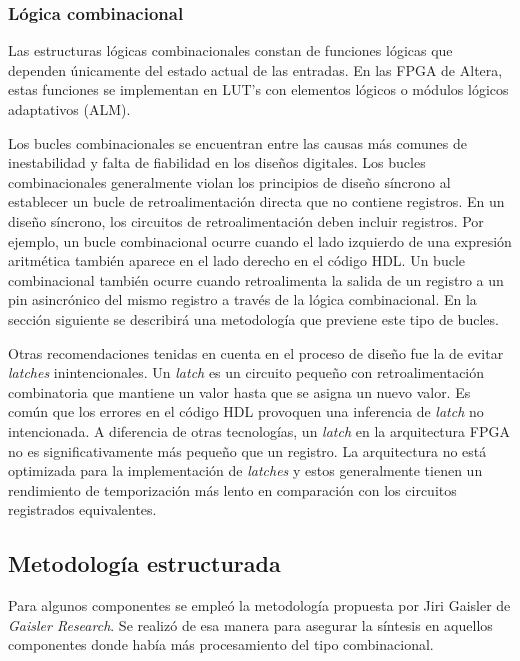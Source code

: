 \subsubsection{Lógica combinacional}

Las estructuras lógicas combinacionales constan de funciones lógicas que dependen únicamente del estado actual de las entradas. En las FPGA de Altera, estas funciones se implementan en LUT's con elementos lógicos o módulos lógicos adaptativos (ALM).

Los bucles combinacionales se encuentran entre las causas más comunes de inestabilidad y falta de fiabilidad en los diseños digitales. Los bucles combinacionales generalmente violan los principios de diseño síncrono al establecer un bucle de retroalimentación directa que no contiene registros. En un diseño síncrono, los circuitos de retroalimentación deben incluir registros. Por ejemplo, un bucle combinacional ocurre cuando el lado izquierdo de una expresión aritmética también aparece en el lado derecho en el código HDL. Un bucle combinacional también ocurre cuando retroalimenta la salida de un registro a un pin asincrónico del mismo registro a través de la lógica combinacional. En la sección siguiente se describirá una metodología que previene este tipo de bucles.

Otras recomendaciones tenidas en cuenta en el proceso de diseño fue la de evitar \textit{latches} inintencionales. Un \textit{latch} es un circuito pequeño con retroalimentación combinatoria que mantiene un valor hasta que se asigna un nuevo valor. Es común que los errores en el código HDL provoquen una inferencia de \textit{latch} no intencionada. A diferencia de otras tecnologías, un \textit{latch} en la arquitectura FPGA no es significativamente más pequeño que un registro. La arquitectura no está optimizada para la implementación de \textit{latches} y estos generalmente tienen un rendimiento de temporización más lento en comparación con los circuitos registrados equivalentes.



\subsection{Metodología estructurada}
\label{metodologia_estructurada}
Para algunos componentes se empleó la metodología propuesta por Jiri Gaisler de \textit{Gaisler Research}. Se realizó de esa manera para asegurar la síntesis en aquellos componentes donde había más procesamiento del tipo combinacional.

